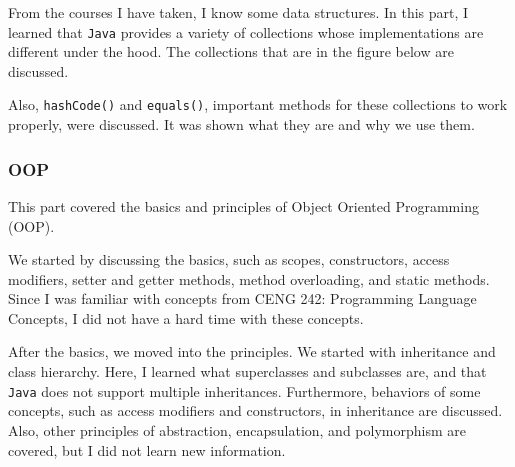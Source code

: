 From the courses I have taken, I know some data structures. In this part, I learned that \texttt{Java} provides a variety of collections whose implementations are different under the hood. The collections that are in the figure below are discussed.  

\begin{figure}[h!]
  \centering
\end{figure}

Also, \texttt{hashCode()} and \texttt{equals()}, important methods for these collections to work properly, were discussed. It was shown what they are and why we use them.

\subsubsection{OOP}

This part covered the basics and principles of Object Oriented Programming (OOP).

We started by discussing the basics, such as scopes, constructors, access modifiers, setter and getter methods, method overloading, and static methods. Since I was familiar with concepts from CENG 242: Programming Language Concepts, I did not have a hard time with these concepts.

After the basics, we moved into the principles. We started with inheritance and class hierarchy. Here, I learned what superclasses and subclasses are, and that \texttt{Java} does not support multiple inheritances. Furthermore, behaviors of some concepts, such as access modifiers and constructors, in inheritance are discussed. Also, other principles of abstraction, encapsulation, and polymorphism are covered, but I did not learn new information.

